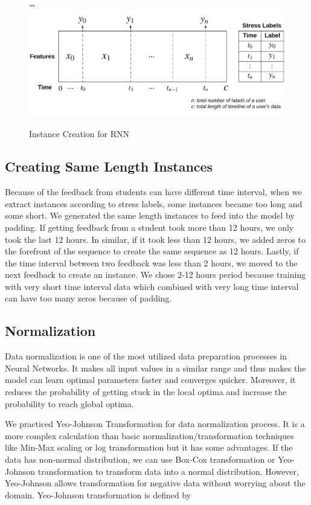 \documentclass[12pt,oneandhalf,chaparabic,lfm,phd,eng,oneside,pntc]{gsufbe}
\makeatletter
\let\old@includegraphics\includegraphics
\renewcommand{\includegraphics}[2][,]{%
  \setbox9=\hbox{\old@includegraphics[#1]{#2}}%
  \ifdim\wd9>\textwidth
    \old@includegraphics[#1,width=\textwidth]{#2}%
  \else
    \old@includegraphics[#1]{#2}%
  \fi%
}
\makeatother
\begin{document}
\begin{figure}[t]\vspace*{4pt}
\centerline{\includegraphics[width=140mm]{graphics/Creating_Instances.png}}
\caption{Instance Creation for RNN}
\label{fig:Instance Creation}
\end{figure}

\subsection{Creating Same Length Instances}
\label{subsec:SameLengthInstances}
Because of the feedback from students can have different time interval, when we extract instances according to stress labels, some instances became too long and some short. We generated the same length instances to feed into the model by padding. If getting feedback from a student took more than 12 hours, we only took the last 12 hours. In similar, if it took less than 12 hours, we added zeros to the forefront of the sequence to create the same sequence as 12 hours. Lastly, if the time interval between two feedback was less than 2 hours, we moved to the next feedback to create an instance. We chose 2-12 hours period because training with very short time interval data which combined with very long time interval can have too many zeros because of padding. 

\subsection{Normalization}
\label{subsec:Normalization}
Data normalization is one of the most utilized data preparation processes in Neural Networks. It makes all input values in a similar range and thus makes the model can learn optimal parameters faster and converges quicker. Moreover, it reduces the probability of getting stuck in the local optima and increase the probability to reach global optima.

We practiced Yeo-Johnson Transformation \cite{yeo2000new}  for data normalization process. It is a more complex calculation than basic normalization/transformation techniques like Min-Max scaling or log transformation but it has some advantages. If the data has non-normal distribution, we can use Box-Cox transformation or Yeo-Johnson transformation to transform data into a normal distribution. However, Yeo-Johnson allows transformation for negative data without worrying about the domain. Yeo-Johnson transformation is defined by
\end{document}
